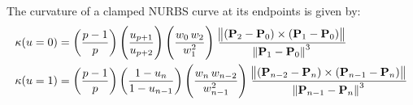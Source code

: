 \begin{enumerate}
    The curvature of a clamped NURBS curve at its endpoints is given by:
    \begin{align*}
        \kappa(u=0) &=  \left( \frac{p-1}{p}  \right)  \left( \frac{u_{p+1}}{u_{p+2}}  \right) \left(\frac{w_{0}\,w_{2}}{w_{1}^2} \right)  \,
        \frac{\norm{ \left(\mathbf{P}_{2}-\mathbf{P}_{0}\right) \times \left(\mathbf{P}_{1}-\mathbf{P}_{0}\right)} }{\norm{\mathbf{P}_{1}-\mathbf{P}_{0}}^3} \\
        \kappa(u=1) &=  \left( \frac{p-1}{p}  \right)  \left( \frac{1-u_{n}}{1-u_{n-1}}  \right) \left(\frac{w_{n}\,w_{n-2}}{w_{n-1}^2} \right)  \,
        \frac{\norm{ \left(\mathbf{P}_{n-2}-\mathbf{P}_{n}\right) \times \left(\mathbf{P}_{n-1}-\mathbf{P}_{n}\right)} }{\norm{\mathbf{P}_{n-1}-\mathbf{P}_{n}}^3}
    \end{align*}


    
\end{enumerate}





